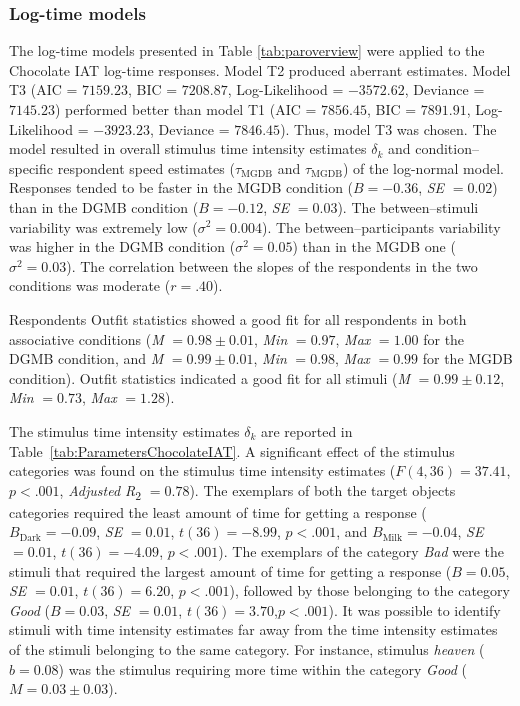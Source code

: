 \documentclass[12pt]{book}
\begin{document}
\subsubsection{Log-time models}

The log-time models presented in Table \ref{tab:paroverview} were applied to the Chocolate IAT log-time responses.
Model T2 produced aberrant estimates. Model T3 (AIC = $7159.23$, BIC = $7208.87$, Log-Likelihood = $-3572.62$, Deviance = $7145.23$) performed better than model T1 (AIC = $7856.45$, BIC = $7891.91$, Log-Likelihood = $-3923.23$, Deviance = $7846.45$). Thus, model T3 was chosen. The model resulted in overall stimulus time intensity estimates $\delta_k$ and  condition--specific respondent speed estimates ($\tau_{\text{MGDB}}$ and $\tau_{\text{MGDB}}$) of the log-normal model.
Responses tended to be faster in the MGDB condition ($B = -0.36$, \emph{SE} $= 0.02$) than in the DGMB condition ($B = -0.12$, \emph{SE} $= 0.03$). The between--stimuli variability was extremely low ($\sigma^2 = 0.004$). The between--participants variability was higher in the DGMB condition ($\sigma^2 = 0.05$) than in the MGDB one ($\sigma^2 = 0.03$). 
The correlation between the slopes of the respondents in the two conditions was moderate ($r = .40$).

Respondents Outfit statistics showed a good fit for all respondents in both associative conditions (\emph{M} $= 0.98 \pm 0.01$, \emph{Min} $= 0.97$, \emph{Max} $= 1.00$ for the DGMB condition, and \emph{M} $= 0.99 \pm 0.01$, \emph{Min} $=
0.98$, \emph{Max} $= 0.99$ for the MGDB condition). Outfit statistics indicated a good fit for all stimuli (\emph{M} $= 0.99 \pm 0.12$, \emph{Min} $= 0.73$, \emph{Max} $= 1.28$). 


The stimulus time intensity estimates $\delta_k$ are reported in Table~\ref{tab:ParametersChocolateIAT}. 
A significant effect of the stimulus categories was found on the stimulus time intensity estimates ($F(4,36)=37.41$, $p < .001$, \emph{Adjusted R}\textsubscript{2} $= 0.78$). 
The exemplars of both the target objects categories required the least amount of time for getting a response ($B_{\text{Dark}} = -0.09$, \emph{SE} $= 0.01$, $t(36)=-8.99$, $p < .001$, and $B_{\text{Milk}} = -0.04$, \emph{SE} $= 0.01$, $t(36)=-4.09$, $p < .001$). 
	The exemplars of the category \emph{Bad} were the stimuli that required the largest amount of time for getting a response ($B = 0.05$, \emph{SE} $= 0.01$, $t(36)=6.20$, $p < .001$), followed by those belonging to the category \emph{Good} ($B = 0.03$, \emph{SE} $= 0.01$, $t(36)=3.70$,$p < .001$).
It was possible to identify stimuli with time intensity estimates far away from the time intensity estimates of the stimuli belonging to the same category. For instance, stimulus \emph{heaven} ($b = 0.08$) was the stimulus requiring more time within the category \emph{Good} ($M = 0.03 \pm 0.03$).
\end{document}
